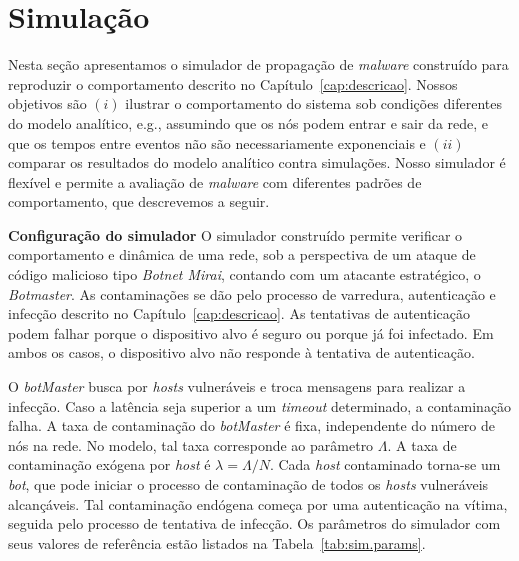 
\chapter{Simulação}
\label{cap:simulacao}



    Nesta seção apresentamos o simulador de propagação de \emph{malware} construído para reproduzir o comportamento descrito no Capítulo~\ref{cap:descricao}. Nossos objetivos são $(i)$ ilustrar o comportamento do sistema sob condições diferentes do modelo analítico, e.g., assumindo que os nós podem entrar e sair da rede, e que os tempos entre eventos não são necessariamente exponenciais e $(ii)$  comparar os resultados do modelo analítico contra simulações.  Nosso simulador é flexível e permite a avaliação de \emph{malware} com diferentes padrões de comportamento, que descrevemos a seguir.

    \textbf{Configuração do simulador} 
    O simulador construído permite verificar o comportamento e dinâmica de uma rede, sob a perspectiva de um ataque de código malicioso tipo \emph{Botnet Mirai}, contando com um atacante estratégico, o \textit{Botmaster}.  As contaminações se dão pelo  processo de varredura, autenticação e infecção descrito no Capítulo~\ref{cap:descricao}.
    As tentativas de autenticação podem falhar porque o dispositivo alvo é seguro ou porque já foi infectado. Em ambos os casos, o dispositivo alvo não responde à tentativa de autenticação.

    O \textit{botMaster} busca por \emph{hosts} vulneráveis e troca mensagens para realizar a infecção.  Caso a latência seja superior a um \textit{timeout} determinado, a contaminação falha. 
    A taxa de contaminação do \textit{botMaster} é fixa, independente do número de nós na rede.  No modelo, tal taxa corresponde ao parâmetro $\Lambda$.   A taxa de contaminação exógena por \emph{host} é $\lambda=\Lambda/N$.  
    Cada \emph{host} contaminado torna-se um \textit{bot}, que pode iniciar o processo de contaminação de todos os \emph{hosts} vulneráveis alcançáveis.  Tal contaminação endógena começa por uma autenticação na vítima, seguida pelo processo de tentativa de infecção. 
    Os parâmetros do simulador com seus valores de referência estão listados na Tabela~\ref{tab:sim.params}.
    

